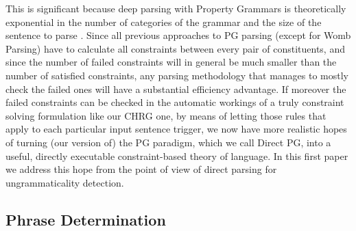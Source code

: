 \documentclass{llncs}
\begin{document}
This is significant because deep parsing with Property Grammars is theoretically exponential in the number of categories of the grammar and the size of the sentence to parse \cite{vanRullen2005}. Since all previous approaches to PG parsing (except for Womb Parsing) have to calculate all constraints between every pair of constituents, and since the number of failed constraints will in general be much smaller than the number of satisfied constraints,  any parsing methodology that manages to mostly check the failed ones will have a substantial efficiency advantage. If moreover the failed constraints can be checked in the automatic workings of a truly constraint solving formulation like our CHRG one, by means of letting those rules that apply to each particular input sentence trigger, we now have more realistic hopes of turning (our version of) the PG paradigm, which we  call Direct PG, into a useful, directly executable constraint-based theory of language. In this first paper we address this hope from the point of view of direct parsing for ungrammaticality detection.


\subsection{Phrase Determination}
\end{document}
